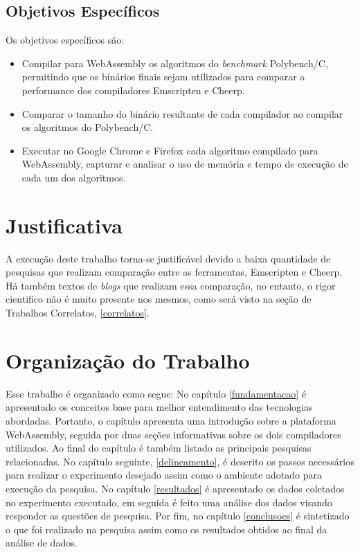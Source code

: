 \subsection{Objetivos Específicos}

Os objetivos específicos são:

\begin{itemize}
    \item Compilar para WebAssembly os algoritmos do \textit{benchmark} Polybench/C\cite{polybench}, permitindo que os binários finais sejam utilizados para comparar a performance dos compiladores Emscripten e Cheerp.
    \item Comparar o tamanho do binário resultante de cada compilador ao compilar os algoritmos do Polybench/C.
    \item Executar no Google Chrome e Firefox cada algoritmo compilado para WebAssembly, capturar e analisar o uso de memória e tempo de execução de cada um dos algoritmos.
\end{itemize}

\section{Justificativa}

A execução deste trabalho torna-se justificável devido a baixa quantidade de pesquisas que realizam comparação entre as ferramentas, Emscripten e Cheerp. Há também textos de \textit{blogs} que realizam essa comparação, no entanto, o rigor cientifico não é muito presente nos mesmos, como será visto na seção de Trabalhos Correlatos, \ref{correlatos}.

\section{Organização do Trabalho}

Esse trabalho é organizado como segue: No capítulo \ref{fundamentacao} é apresentado os conceitos base para melhor entendimento das tecnologias abordadas. Portanto, o capítulo apresenta uma introdução sobre a plataforma WebAssembly, seguida por duas seções informativas sobre os dois compiladores utilizados. Ao final do capítulo é também listado as principais pesquisas relacionadas. No capítulo seguinte, \ref{delineamento}, é descrito os passos necessários para realizar o experimento desejado assim como o ambiente adotado para execução da pesquisa. No capítulo \ref{resultados} é apresentado os dados coletados no experimento executado, em seguida é feito uma análise dos dados visando responder as questões de pesquisa. Por fim, no capítulo \ref{conclusoes} é sintetizado o que foi realizado na pesquisa assim como os resultados obtidos ao final da análise de dados.


